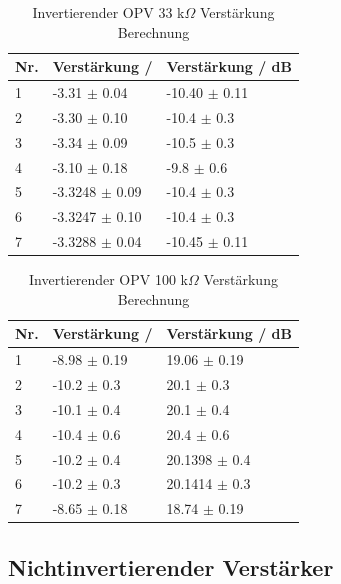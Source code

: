 \documentclass[12pt,a4paper,twoside]{article}
\begin{document}
\begin{table}[H]
    \centering
    \caption{Invertierender OPV 33 k$\Omega$ Verstärkung Berechnung}
    \label{tab:IoVerstärkungenBerechnet33AW}
    \begin{tabular}{| l | l | l |}
        \hline
        Nr. & Verstärkung / & Verstärkung / dB \\
        \hline
        1 & -3.31 $\pm$ 0.04 & -10.40 $\pm$ 0.11 \\
        2 & -3.30 $\pm$ 0.10 & -10.4 $\pm$ 0.3 \\
        3 & -3.34 $\pm$ 0.09 & -10.5 $\pm$ 0.3 \\
        4 & -3.10 $\pm$ 0.18 & -9.8 $\pm$ 0.6 \\
        5 & -3.3248 $\pm$ 0.09 & -10.4 $\pm$ 0.3 \\
        6 & -3.3247 $\pm$ 0.10 & -10.4 $\pm$ 0.3 \\
        7 & -3.3288 $\pm$ 0.04 & -10.45 $\pm$ 0.11 \\
        \hline
    \end{tabular}
\end{table}

\begin{table}[H]
    \centering
    \caption{Invertierender OPV 100 k$\Omega$ Verstärkung Berechnung}
    \label{tab:IoVerstärkungenBerechnet100AW}
    \begin{tabular}{| l | l | l |}
        \hline
        Nr. & Verstärkung / & Verstärkung / dB \\
        \hline
        1 & -8.98 $\pm$ 0.19 & 19.06 $\pm$ 0.19 \\
        2 & -10.2 $\pm$ 0.3 & 20.1 $\pm$ 0.3 \\
        3 & -10.1 $\pm$ 0.4 & 20.1 $\pm$ 0.4 \\
        4 & -10.4 $\pm$ 0.6 & 20.4 $\pm$ 0.6 \\
        5 & -10.2 $\pm$ 0.4 & 20.1398 $\pm$ 0.4 \\
        6 & -10.2 $\pm$ 0.3 & 20.1414 $\pm$ 0.3 \\
        7 & -8.65 $\pm$ 0.18 & 18.74 $\pm$ 0.19 \\
        \hline
    \end{tabular}
\end{table}

\subsection{Nichtinvertierender Verstärker}
\end{document}
